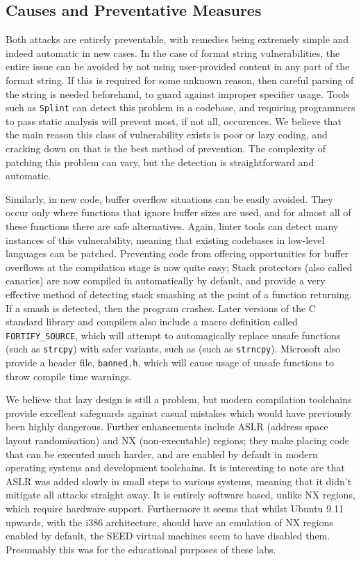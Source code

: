 \subsection{Causes and Preventative Measures}
Both attacks are entirely preventable, with remedies being extremely simple and indeed automatic in new cases.
In the case of format string vulnerabilities, the entire issue can be avoided by not using user-provided content in
any part of the format string. If this is required for some unknown reason, then careful parsing of the string 
is needed beforehand, to guard against improper specifier usage. Tools such as {\tt Splint} can detect 
this problem in a codebase\cite{splint_art}, and requiring programmers to pass static analysis will prevent most,
if not all, occurences. We believe that the main reason this class of vulnerability exists is poor or lazy
coding, and cracking down on that is the best method of prevention. The complexity of patching this problem can vary,
but the detection is straightforward and automatic.

Similarly, in new code, buffer overflow situations can be easily avoided. They occur only where functions that ignore
buffer sizes are used, and for almost all of these functions there are safe alternatives. Again, linter tools can
detect many instances of this vulnerability, meaning that existing codebases in low-level languages can be patched.
Preventing code from offering opportunities for buffer overflows at the compilation stage is now quite easy; 
Stack protectors (also called canaries) are now compiled in automatically by default, and provide a very effective
method of detecting stack smashing at the point of a function returning. If a smash is detected, then the program crashes.
Later versions of the C standard library and compilers also include a macro definition called {\tt FORTIFY\_SOURCE},
which will attempt to automagically replace unsafe functions (such as {\tt strcpy}) with safer variants, such as 
(such as {\tt strncpy})\cite{fort_source}. Microsoft also provide a header file, {\tt banned.h}, which will cause
usage of unsafe functions to throw compile time warnings\cite{banned}.

We believe that lazy design is still a problem, but modern compilation toolchains provide excellent safeguards against
casual mistakes which would have previously been highly dangerous. Further enhancements include ASLR (address space
layout randomisation) and NX (non-executable) regions; they make placing code that can be executed much harder,
and are enabled by default in modern operating systems and development toolchains\cite{wiki_aslr}\cite{wiki_nx}.
It is interesting to note are that ASLR was added slowly in small steps to various systems, meaning that it didn't
mitigate all attacks straight away. It is entirely software based, unlike NX regions, which require hardware support.
Furthermore it seems that whilst Ubuntu 9.11 upwards, with the i386 architecture, should have an emulation of NX regions
enabled by default\cite{nx_bit}, the SEED virtual machines seem to have disabled them. 
Presumably this was for the educational purposes of these labs.


